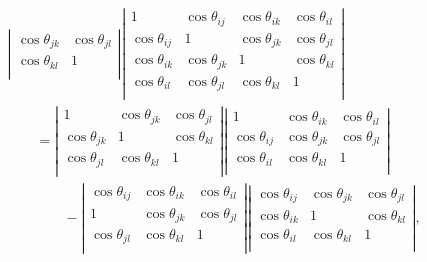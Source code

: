\documentclass[fleqn,11pt,twoside]{article}
\theoremstyle{definition}
\begin{document}
\begin{equation}
\begin{split}
&\left|\begin{array}{cc}
\cos\theta_{jk} & \cos\theta_{jl}\\
\cos\theta_{kl} & 1\\
\end{array}\right|
\left|\begin{array}{cccc}
1 &  \cos\theta_{ij} & \cos\theta_{ik} & \cos\theta_{il}\\
\cos\theta_{ij} & 1 & \cos\theta_{jk} & \cos\theta_{jl}\\
\cos\theta_{ik} & \cos\theta_{jk} & 1 & \cos\theta_{kl}\\
\cos\theta_{il} & \cos\theta_{jl} & \cos\theta_{kl} & 1\\
\end{array}\right|\\
&\qquad =\left|\begin{array}{ccc}
1 & \cos\theta_{jk} & \cos\theta_{jl}\\
\cos\theta_{jk} & 1 & \cos\theta_{kl}\\
\cos\theta_{jl} & \cos\theta_{kl} & 1\\
\end{array}\right|
\left|\begin{array}{ccc}
1 & \cos\theta_{ik} & \cos\theta_{il}\\
\cos\theta_{ij} & \cos\theta_{jk} & \cos\theta_{jl}\\
\cos\theta_{il} & \cos\theta_{kl} & 1\\
\end{array}\right| \nonumber \\ 
& \qquad\qquad -
\left|\begin{array}{ccc}
\cos\theta_{ij} & \cos\theta_{ik} & \cos\theta_{il}\\
1 & \cos\theta_{jk} & \cos\theta_{jl}\\
\cos\theta_{jl} & \cos\theta_{kl} & 1\\
\end{array}\right|
\left|\begin{array}{ccc}
\cos\theta_{ij} & \cos\theta_{jk} & \cos\theta_{jl}\\
\cos\theta_{ik} & 1 & \cos\theta_{kl}\\
\cos\theta_{il} & \cos\theta_{kl} & 1\\
\end{array}\right|,
\end{split}
\end{equation}
\end{document}
